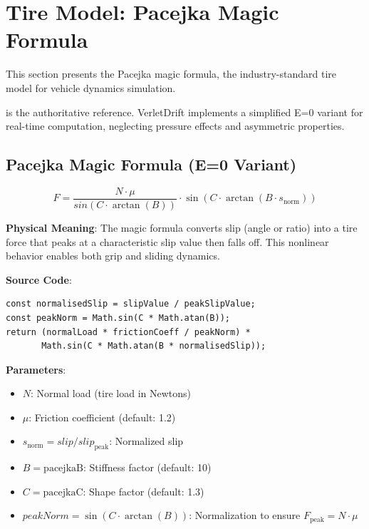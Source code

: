 \section{Tire Model: Pacejka Magic Formula}

This section presents the Pacejka magic formula, the industry-standard tire model for vehicle dynamics simulation.

\cite{pacejka2005tire} is the authoritative reference. VerletDrift implements a simplified E=0 variant for real-time computation, neglecting pressure effects and asymmetric properties.

\subsection{Pacejka Magic Formula (E=0 Variant)}

\begin{equation}
  F = \frac{N \cdot \mu}{sin(C \cdot \arctan(B))} \cdot \sin(C \cdot \arctan(B \cdot s_{\text{norm}}))
  \label{eq:pacejka-force}
\end{equation}

\textbf{Physical Meaning}: The magic formula converts slip (angle or ratio) into a tire force that peaks at a characteristic slip value then falls off. This nonlinear behavior enables both grip and sliding dynamics.

\textbf{Source Code}: 

\begin{lstlisting}[caption={Pacejka magic formula (E=0)}]
const normalisedSlip = slipValue / peakSlipValue;
const peakNorm = Math.sin(C * Math.atan(B));
return (normalLoad * frictionCoeff / peakNorm) *
       Math.sin(C * Math.atan(B * normalisedSlip));
\end{lstlisting}

\textbf{Parameters}:
\begin{itemize}
  \item $N$: Normal load (tire load in Newtons)
  \item $\mu$: Friction coefficient (default: 1.2)
  \item $s_{\text{norm}} = slip / slip_{\text{peak}}$: Normalized slip
  \item $B = \mathrm{pacejkaB}$: Stiffness factor (default: 10)
  \item $C = \mathrm{pacejkaC}$: Shape factor (default: 1.3)
  \item $peakNorm = \sin(C \cdot \arctan(B))$: Normalization to ensure $F_{\text{peak}} = N \cdot \mu$
\end{itemize}

